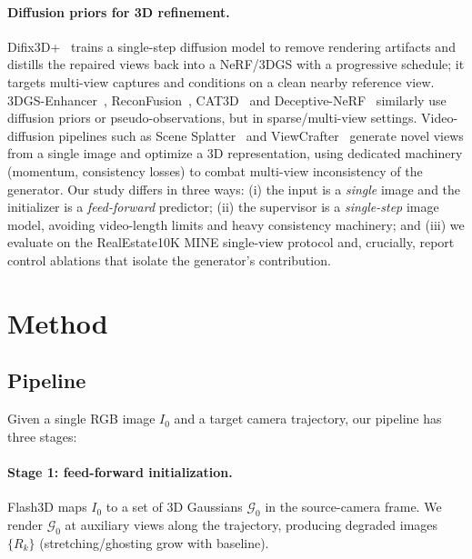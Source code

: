 \documentclass[10pt,twocolumn,letterpaper]{article}
\begin{document}
\paragraph{Diffusion priors for 3D refinement.}
Difix3D+~\cite{difix} trains a single-step diffusion model to remove rendering
artifacts and distills the repaired views back into a NeRF/3DGS with a
progressive schedule; it targets multi-view captures and conditions on a clean
nearby reference view. 3DGS-Enhancer~\cite{gsenhancer},
ReconFusion~\cite{reconfusion}, CAT3D~\cite{cat3d} and
Deceptive-NeRF~\cite{deceptivenerf} similarly use diffusion priors or
pseudo-observations, but in sparse/multi-view settings. Video-diffusion
pipelines such as Scene Splatter~\cite{scenesplatter} and
ViewCrafter~\cite{viewcrafter} generate novel views from a single image and
optimize a 3D representation, using dedicated machinery (momentum, consistency
losses) to combat multi-view inconsistency of the generator. Our study differs
in three ways: (i) the input is a \emph{single} image and the initializer is a
\emph{feed-forward} predictor; (ii) the supervisor is a \emph{single-step}
image model, avoiding video-length limits and heavy consistency machinery; and
(iii) we evaluate on the RealEstate10K MINE single-view protocol and, crucially,
report control ablations that isolate the generator's contribution.

\section{Method}
\label{sec:method}

\subsection{Pipeline}
Given a single RGB image $I_0$ and a target camera trajectory, our pipeline has
three stages:

\paragraph{Stage 1: feed-forward initialization.}
Flash3D maps $I_0$ to a set of 3D Gaussians $\mathcal{G}_0$ in the source-camera
frame. We render $\mathcal{G}_0$ at auxiliary views along the trajectory,
producing degraded images $\{R_k\}$ (stretching/ghosting grow with baseline).
\end{document}
